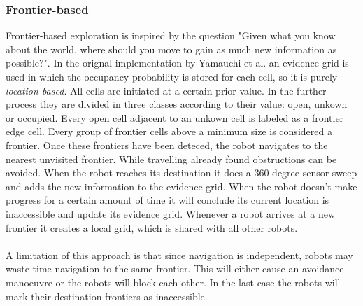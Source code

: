 	\subsubsection{Frontier-based}
	Frontier-based exploration is inspired by the question "Given what you know about the world, where should you move to gain as much new information as possible?". In the orignal implementation by Yamauchi et al. \cite{yamauchi1998frontier} an evidence grid is used in which the occupancy probability is stored for each cell, so it is purely \emph{location-based}.
	All cells are initiated at a certain prior value.
	In the further process they are divided in three classes according to their value: open, unkown or occupied.
	Every open cell adjacent to an unkown cell is labeled as a frontier edge cell.
	Every group of frontier cells above a minimum size is considered a frontier.
	Once these frontiers have been deteced, the robot navigates to the nearest unvisited frontier.
	While travelling already found obstructions can be avoided.
	When the robot reaches its destination it does a 360 degree sensor sweep and adds the new information to the evidence grid.
	When the robot doesn't make progress for a certain amount of time it will conclude its current location is inaccessible and update its evidence grid.
	Whenever a robot arrives at a new frontier it creates a local grid, which is shared with all other robots.\\
	\\
	A limitation of this approach is that since navigation is independent, robots may waste time navigation to the same frontier.
	This will either cause an avoidance manoeuvre or the robots will block each other.
	In the last case the robots will mark their destination frontiers as inaccessible.



